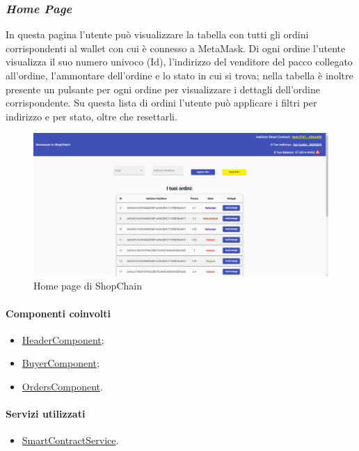 \newpage

\subsubsection*{\textit{Home Page}}
In questa pagina l'utente può visualizzare la tabella con tutti gli ordini corrispondenti al wallet con cui è connesso a MetaMask. Di ogni ordine l'utente visualizza il suo numero univoco (Id), l'indirizzo del venditore del pacco collegato all'ordine, l'ammontare dell'ordine e lo stato in cui si trova; nella tabella è inoltre presente un pulsante per ogni ordine per visualizzare i dettagli dell'ordine corrispondente. Su questa lista di ordini l'utente può applicare i filtri per indirizzo e per stato, oltre che resettarli.

\begin{figure}[!h] 
    \centering 
    \includegraphics[width=1\columnwidth]{immagini/maschere/homepage.png} 
    \caption{Home page di ShopChain}
\end{figure}

\paragraph{Componenti coinvolti}
\begin{itemize}
    \item \hyperref[sec:header-component]{HeaderComponent};
    \item \hyperref[sec:buyer-component]{BuyerComponent};
    \item \hyperref[sec:orders-component]{OrdersComponent}.
\end{itemize}

\paragraph{Servizi utilizzati}
\begin{itemize}
    \item \hyperref[sec:smart-contract-service]{SmartContractService}.
\end{itemize}

